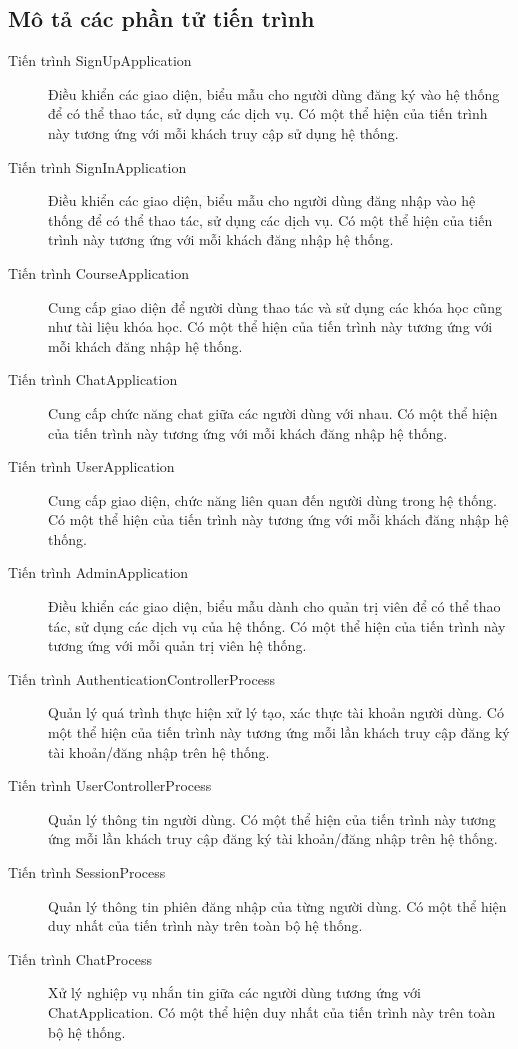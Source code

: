\documentclass[./../main_file.tex]{subfiles}
\begin{document}
	\subsection{Mô tả các phần tử tiến trình}
	\begin{description}
		\item[Tiến trình SignUpApplication] Điều khiển các giao diện, biểu mẫu cho người dùng đăng ký vào hệ thống để có thể thao tác, sử dụng các dịch vụ.
		Có một thể hiện của tiến trình này tương ứng với mỗi khách truy cập sử dụng hệ thống.
		\item[Tiến trình SignInApplication] Điều khiển các giao diện, biểu mẫu cho người dùng đăng nhập vào hệ thống để có thể thao tác, sử dụng các dịch vụ.
		Có một thể hiện của tiến trình này tương ứng với mỗi khách đăng nhập hệ thống.
		\item[Tiến trình CourseApplication] Cung cấp giao diện để người dùng thao tác và sử dụng các khóa học cũng như tài liệu khóa học. Có một thể hiện của tiến trình này tương ứng với mỗi khách đăng nhập hệ thống.
		\item[Tiến trình ChatApplication] Cung cấp chức năng chat giữa các người dùng với nhau. Có một thể hiện của tiến trình này tương ứng với mỗi khách đăng nhập hệ thống.
		\item[Tiến trình UserApplication] Cung cấp giao diện, chức năng liên quan đến người dùng trong hệ thống. Có một thể hiện của tiến trình này tương ứng với mỗi khách đăng nhập hệ thống.
		\item[Tiến trình AdminApplication] Điều khiển các giao diện, biểu mẫu dành cho quản trị viên để có thể thao tác, sử dụng các dịch vụ của hệ thống.
		Có một thể hiện của tiến trình này tương ứng với mỗi quản trị viên hệ thống.
		\item[Tiến trình AuthenticationControllerProcess] Quản lý quá trình thực hiện xử lý tạo, xác thực tài khoản người dùng.
		Có một thể hiện của tiến trình này tương ứng mỗi lần khách truy cập đăng ký tài khoản/đăng nhập trên hệ thống.
		\item[Tiến trình UserControllerProcess] Quản lý thông tin người dùng. Có một thể hiện của tiến trình này tương ứng mỗi lần khách truy cập đăng ký tài khoản/đăng nhập trên hệ thống.
		\item[Tiến trình SessionProcess] Quản lý thông tin phiên đăng nhập của từng người dùng. Có một thể hiện duy nhất của tiến trình này trên toàn bộ hệ thống.
		\item[Tiến trình ChatProcess] Xử lý nghiệp vụ nhắn tin giữa các người dùng tương ứng với ChatApplication. Có một thể hiện duy nhất của tiến trình này trên toàn bộ hệ thống.

\end{description}
\end{document}
